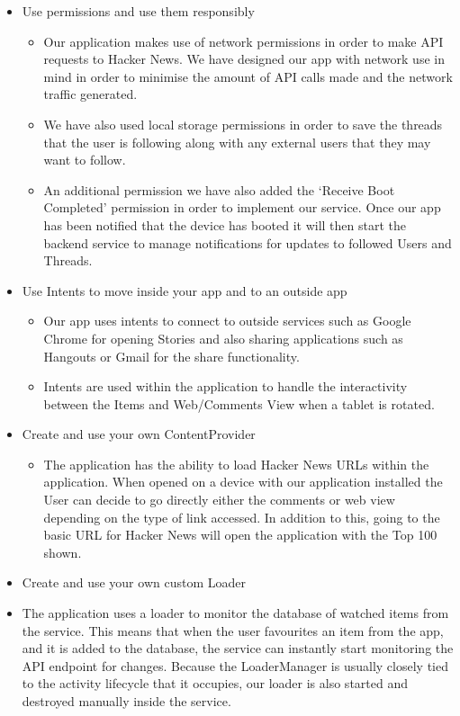 \documentclass[11pt]{article}
\begin{document}
\begin{itemize}
\begin{itemize}
\begin{center}
			\end{center}
	\end{itemize}
	\item{Use permissions and use them responsibly}
	\begin{itemize}
		\item{Our application makes use of network permissions in order to make API requests to Hacker News. We have designed our app with network use in mind in order to minimise the amount of API calls made and the network traffic generated.}
		\item{We have also used local storage permissions in order to save the threads that the user is following along with any external users that they may want to follow.}
		\item{An additional permission we have also added the ‘Receive Boot Completed’ permission in order to implement our service. Once our app has been notified that the device has booted it will then start the backend service to manage notifications for updates to followed Users and Threads.}
	\end{itemize}
	\item{Use Intents to move inside your app and to an outside app}
	\begin{itemize}
		\item{Our app uses intents to connect to outside services such as Google Chrome for opening Stories and also sharing applications such as Hangouts or Gmail for the share functionality.}
		\item{Intents are used within the application to handle the interactivity between the Items and Web/Comments View when a tablet is rotated.}
	\end{itemize}
	\item{Create and use your own ContentProvider}
	\begin{itemize}
		\item{The application has the ability to load Hacker News URLs within the application. When opened on a device with our application installed the User can decide to go directly either the comments or web view depending on the type of link accessed. In addition to this, going to the basic URL for Hacker News will open the application with the Top 100 shown.}
	\end{itemize}
	\item{Create and use your own custom Loader}
	\item{The application uses a loader to monitor the database of watched items from the service. This means that when the user favourites an item from the app, and it is added to the database, the service can instantly start monitoring the API endpoint for changes. Because the LoaderManager is usually closely tied to the activity lifecycle that it occupies, our loader is also started and destroyed manually inside the service.}

\end{itemize}
\end{document}
